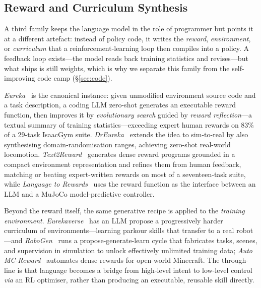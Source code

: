 \subsection{Reward and Curriculum Synthesis}
\label{sec:reward}

A third family keeps the language model in the role of programmer but points it at a
different artefact: instead of policy code, it writes the \emph{reward}, \emph{environment},
or \emph{curriculum} that a reinforcement-learning loop then compiles into a policy. A
feedback loop exists---the model reads back training statistics and revises---but what ships
is still weights, which is why we separate this family from the self-improving code camp
(\S\ref{sec:code}).

\emph{Eureka}~\citep{eureka} is the canonical instance: given unmodified environment source
code and a task description, a coding LLM zero-shot generates an executable reward function,
then improves it by \emph{evolutionary search} guided by \emph{reward reflection}---a textual
summary of training statistics---exceeding expert human rewards on 83\% of a 29-task IsaacGym
suite. \emph{DrEureka}~\citep{dreureka} extends the idea to sim-to-real by also synthesising
domain-randomisation ranges, achieving zero-shot real-world locomotion.
\emph{Text2Reward}~\citep{text2reward} generates dense reward programs grounded in a compact
environment representation and refines them from human feedback, matching or beating
expert-written rewards on most of a seventeen-task suite, while \emph{Language to
Rewards}~\citep{l2r} uses the reward function as the interface between an LLM and a MuJoCo
model-predictive controller.

Beyond the reward itself, the same generative recipe is applied to the \emph{training
environment}. \emph{Eurekaverse}~\citep{eurekaverse} has an LLM propose a progressively harder
curriculum of environments---learning parkour skills that transfer to a real robot---and
\emph{RoboGen}~\citep{robogen} runs a propose-generate-learn cycle that fabricates tasks,
scenes, and supervision in simulation to unlock effectively unlimited training data;
\emph{Auto MC-Reward}~\citep{automcreward} automates dense rewards for open-world Minecraft.
The through-line is that language becomes a bridge from high-level intent to low-level control
\emph{via} an RL optimiser, rather than producing an executable, reusable skill directly.
